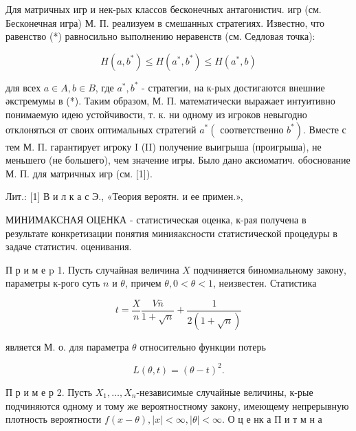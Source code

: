 \documentclass[10pt]{article}
\begin{document}
Для матричных игр и нек-рых классов бесконечных антагонистич. игр (см. Бесконечная игра) М. П. реализуем в смешанных стратегиях. Известно, что равенство (*) равносильно выполнению неравенств (см. Седловая точка):



\[

H\left(a, b^{*}\right) \leqslant H\left(a^{*}, b^{*}\right) \leqslant H\left(a^{*}, b\right)

\]



для всех $a \in A, b \in B$, где $a^{*}, b^{*}$ - стратегии, на к-рых достигаются внешние әкстремумы в (*). Таким образом, М. П. математически выражает интуитивно понимаемую идею устойчивости, т. к. ни одному из игроков невыгодно отклоняться от своих оптимальных стратегий $a^{*}\left(\right.$ соответственно $\left.b^{*}\right)$. Вместе с тем М. П. гарантирует игроку I (II) получение выигрыша (проигрыша), не меньшего (не большего), чем значение игры. Было дано аксиоматич. обоснование М. П. для матричных игр (см. [1]).



Лит.: [1] В и л к а с Э., «Теория вероятн. и ее примен.»,



МИНИМАКСНАЯ ОЦЕНКА - статистическая оценка, к-рая получена в результате конкретизации понятия минияаксности статистической процедуры в задаче статистич. оценивания.



П р и м е p 1. Пусть случайная величина $X$ подчиняется биномиальному закону, параметры к-рого суть $n$ и $\theta$, причем $\theta, 0<\theta<1$, неизвестен. Статистика



\[

t=\frac{X}{n} \frac{V \bar{n}}{1+\sqrt{n}}+\frac{1}{2(1+\sqrt{n})}

\]



является М. о. для параметра $\theta$ относительно функции потерь



\[

L(\theta, t)=(\theta-t)^{2} .

\]



П р и м е р 2. Пусть $X_{1}, \ldots, X_{n}$-независимые случайные величины, к-рые подчиняются одному и тому же вероятностному закону, имеющему непрерывную плотность вероятности $f(x-\theta),|x|<\infty,|\theta|<\infty$. О ц е нк а П и т м н а
\end{document}
